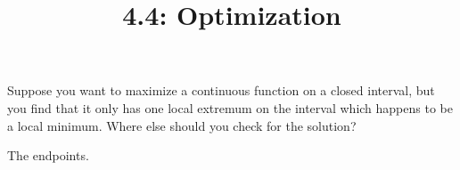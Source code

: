 \documentclass[nooutcomes]{ximera}
\title{4.4: Optimization}
\begin{document}
\begin{abstract}
\end{abstract}
\maketitle

\begin{problem}

  Suppose you want to maximize a continuous function on a closed interval, but you find that it only has one local extremum on the  interval which happens to be a local minimum.
  Where else should you check for the solution?
\begin{freeResponse}
  The endpoints.
\end{freeResponse}	
\end{problem}
\end{document}
